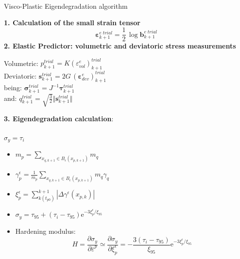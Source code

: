 \documentclass[applsci,journal,article,submit,moreauthors,pdftex]{Definitions/mdpi}
\begin{document}
\clearpage
\begin{algorithm}
\caption{Visco-Plastic Eigendegradation algorithm}\label{alg1}
\begin{algorithmic}
\State \textbf{1. Calculation of the small strain tensor}
$$
\boldsymbol{\varepsilon}^{e\; trial}_{k+1}=\frac{1}{2}\,\log\mathbf{b}^{e\; trial}_{k+1}
$$
\State
\textbf{2. Elastic Predictor: volumetric and deviatoric stress measurements}
\begin{center}
Volumetric:  $p^{trial}_{k+1}=K \left(\varepsilon^{e}_{vol}\right)^{trial}_{k+1}$\\
Deviatoric:  $
\mathbf{s}^{trial}_{k+1}=2G\,\left(\boldsymbol{\varepsilon}^{e}_{dev}\right)^{trial}_{k+1}
$\\
\vspace{0.3cm}
being: $
\mathbf{\sigma}^{trial}_{k+1}=J^{-1}\mathbf{\tau}^{trial}_{k+1}
$\\
\vspace{0.3cm}
and:
$q^{trial}_{k+1}=\sqrt{\frac{3}{2}} \Vert \mathbf{s}^{trial}_{k+1} \Vert$
\vspace{0.15cm}
\end{center}
\textbf{3. Eigendegradation calculation}:\\
\\
$\sigma_y=\tau_i$
\ELSE
\begin{itemize}
\item
$
m_{p}=\sum_{x_{q,k+1}\in B_\epsilon (x_{p,k+1})}m_q
$
\vspace{0.15cm}
\item
$
\gamma^{\epsilon}_{p}=\frac{1}{m_{p}}\sum_{x_{q,k+1}\in B_\epsilon (x_{p,k+1})}m_q \gamma_{q}
$
\vspace{0.15cm}
\item
$
\xi^{\epsilon}_{p}=\sum^{k+1}_{k(t_{p0})} \left|\Delta\gamma^{\epsilon}(x_{p,k})\right| 
$
\vspace{0.15cm}
\item
$
\sigma_y=\tau_{95}+\left(\tau_{i}-\tau_{95}\right) \mathrm{e}^{-3 \xi^{\epsilon}_{p} / \xi_{95}}
$
\vspace{0.15cm}
\item Hardening modulus:
$$
H=\frac{\partial \sigma_y}{\partial\overline{\varepsilon}^p} \simeq \frac{\partial \sigma_y}{\partial \xi^{\epsilon}_{p}} = -\frac{3\left(\tau_{i}-\tau_{95}\right)}{\xi_{95}} \mathrm{e}^{-3 \xi^{\epsilon}_{p} / \xi_{95}}
$$
\end{itemize}
\ENDIF
\\
\vspace{0.3cm}

\end{algorithmic}
\end{algorithm}
\end{document}
